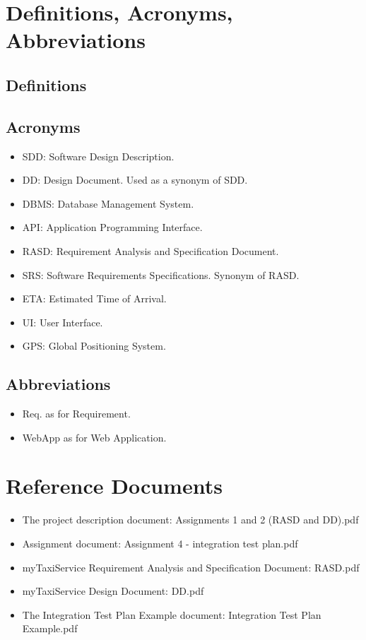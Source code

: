 \section{Definitions, Acronyms, Abbreviations}
\subsection{Definitions}
\subsection{Acronyms}
\begin{itemize}
	\item SDD: Software Design Description.
	\item DD: Design Document. Used as a synonym of SDD.
	\item DBMS: Database Management System.
	\item API: Application Programming Interface.
	\item RASD: Requirement Analysis and Specification Document.
	\item SRS: Software Requirements Specifications. Synonym of RASD.
	\item ETA: Estimated Time of Arrival.
	\item UI: User Interface.
	\item GPS: Global Positioning System.
\end{itemize}
\subsection{Abbreviations}
\begin{itemize}
	\item Req. as for Requirement.
	\item WebApp as for Web Application.
\end{itemize}
\section{Reference Documents}
\begin{itemize}
	\item The project description document: Assignments 1 and 2 (RASD and DD).pdf
	\item Assignment document: Assignment 4 - integration test plan.pdf
	\item myTaxiService Requirement Analysis and Specification Document: RASD.pdf
	\item myTaxiService Design Document: DD.pdf
	\item The Integration Test Plan Example document: Integration Test Plan Example.pdf
\end{itemize} 
